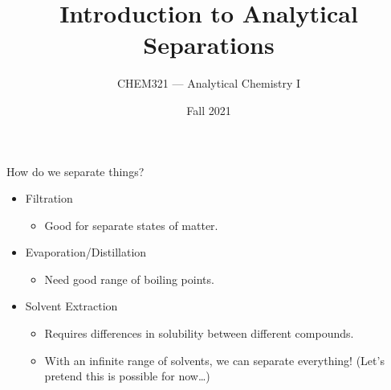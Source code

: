 \documentclass[notes=only]{beamer}
\title{Introduction to Analytical Separations}
\institute{Bloomsburg University}
\author{CHEM321 --- Analytical Chemistry I}
\date{Fall 2021}
\begin{document}
\maketitle
{}

\begin{frame}{How do we separate things?}
	\begin{itemize}[<+->]
		\item Filtration
			\begin{itemize}[<1->]
				\item Good for separate states of matter.
			\end{itemize}
		\item Evaporation/Distillation
			\begin{itemize}[<1->]
				\item Need good range of boiling points.
			\end{itemize}
		\item Solvent Extraction
			\begin{itemize}[<1->]
				\item Requires differences in solubility between
					different compounds.
				\item With an infinite range of solvents, we can
					separate everything!
					{\footnotesize (Let's pretend this is
					possible for now\ldots)}
			\end{itemize}
	\end{itemize}
\end{frame}


\end{document}

